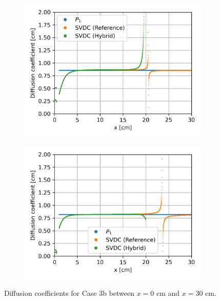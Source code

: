 \begin{frame}
\begin{figure}
\begin{subfigure}[t]{.35\textwidth}
      \centering
      \includegraphics[width=\textwidth]{../images/case-3b-group-3-diffcoef}
      \label{fig:c3bg3dc}
    \end{subfigure}
    \begin{subfigure}[t]{.35\textwidth}
      \centering
      \includegraphics[width=\textwidth]{../images/case-3b-group-4-diffcoef}
      \label{fig:c3bg4dc}
    \end{subfigure}
    \caption{Diffusion coefficients for Case 3b between $x=0$ cm and $x=30$ cm.}
    \label{fig:c3bdiffcoef}
  \end{figure}
\end{frame}

